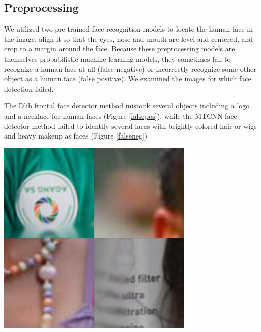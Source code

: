 \documentclass[11pt, letterpaper]{article}
\newenvironment{Figure}
  {\par\medskip\noindent\minipage{\linewidth}}
  {\endminipage\par\medskip}
\begin{document}
\begin{multicols}{2}
  \subsection{Preprocessing}

  We utilized two pre-trained face recognition models to locate the human face
  in the image, align it so that the eyes, nose and mouth are level and
  centered, and crop to a margin around the face. Because these preprocessing
  models are themselves probabilistic machine learning models, they sometimes
  fail to recognize a human face at all (false negative) or incorrectly
  recognize some other object as a human face (false positive). We examined the
  images for which face detection failed.

  The Dlib frontal face detector method mistook several objects including a logo
  and a necklace for human faces (Figure \ref{falsepos}), while the MTCNN face
  detector method failed to identify several faces with brightly colored hair or
  wigs and heavy makeup as faces (Figure \ref{falseneg})

  \begin{Figure}
    \centering
    \includegraphics[width=0.7\textwidth]{figures/false-positives.jpg}
    \label{falsepos}
  \end{Figure}


\end{multicols}
\end{document}
